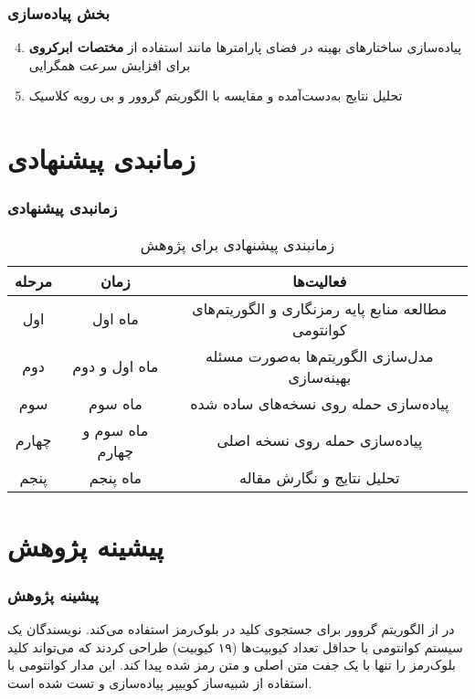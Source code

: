\documentclass[xcolor=dvipsnames, professionalfonts, aspectratio=169, 11pt]{beamer}
\begin{document}
\begin{frame}
    \frametitle{بخش پیاده‌سازی}
    \begin{enumerate}
        \setcounter{enumi}{3}
        \item پیاده‌سازی ساختارهای بهینه در فضای پارامترها مانند استفاده از \textbf{مختصات ابرکروی} برای افزایش سرعت همگرایی
        \cite{bermejo2024improving}
        \item تحلیل نتایج به‌دست‌آمده و مقایسه با الگوریتم گروور و بی رویه کلاسیک
    \end{enumerate}
\end{frame}

\section{زمانبدی پیشنهادی}
\begin{frame}
    \frametitle{زمانبدی پیشنهادی}
    \begin{table}
        \caption{زمانبندی پیشنهادى براى پژوهش}
        \vspace{-1em}
        \small
        \begin{tabular}{|c|c|c|}
            \hline
            \textbf{مرحله} & \textbf{زمان} & \textbf{فعالیت‌ها} \\
            \hline
            اول & ماه اول & مطالعه منابع پایه رمزنگارى و الگوریتم‌هاى کوانتومى \\
            \hline
            دوم & ماه اول و دوم & مدل‌سازى الگوریتم‌ها به‌صورت مسئله بهینه‌سازى \\
            \hline
            سوم & ماه سوم & پیاده‌سازى حمله روى نسخه‌هاى ساده شده \\
            \hline
            چهارم & ماه سوم و چهارم & پیاده‌سازى حمله روى نسخه اصلى \\
            \hline
            پنجم & ماه پنجم & تحلیل نتایج و نگارش مقاله \\
            \hline
        \end{tabular}
    \end{table}
\end{frame}

\section{پیشینه پژوهش}
\begin{frame}
    \frametitle{پیشینه پژوهش}
    \begin{moredi}
        \item در \cite{denisenko2019application} از الگوریتم گروور برای جستجوی کلید در بلوک‌رمز استفاده می‌کند. نویسندگان یک سیستم کوانتومی با حداقل تعداد کیوبیت‌ها (۱۹ کیوبیت) طراحی کردند که می‌تواند کلید بلوک‌رمز را تنها با یک جفت متن اصلی و متن رمز شده پیدا کند. این مدار کوانتومی با استفاده از شبیه‌ساز کوییپر پیاده‌سازی و تست شده است.     
    \end{moredi}
\end{frame}
\end{document}
